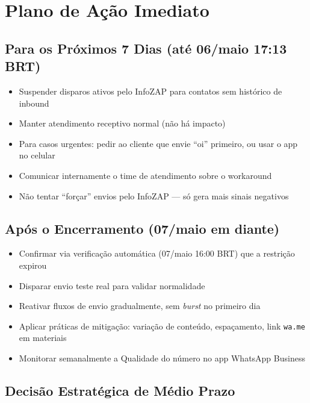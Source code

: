 \documentclass[12pt, a4paper]{article}
\begin{document}
\needspace{10cm}

\section{Plano de Ação Imediato}

\subsection{Para os Próximos 7 Dias (até 06/maio 17:13 BRT)}

\begin{itemize}[label=$\square$]
    \item Suspender disparos ativos pelo InfoZAP para contatos sem histórico de inbound
    \item Manter atendimento receptivo normal (não há impacto)
    \item Para casos urgentes: pedir ao cliente que envie ``oi'' primeiro, ou usar o app no celular
    \item Comunicar internamente o time de atendimento sobre o workaround
    \item Não tentar ``forçar'' envios pelo InfoZAP --- só gera mais sinais negativos
\end{itemize}

\subsection{Após o Encerramento (07/maio em diante)}

\begin{itemize}[label=$\square$]
    \item Confirmar via verificação automática (07/maio 16:00 BRT) que a restrição expirou
    \item Disparar envio teste real para validar normalidade
    \item Reativar fluxos de envio gradualmente, sem \textit{burst} no primeiro dia
    \item Aplicar práticas de mitigação: variação de conteúdo, espaçamento, link \texttt{wa.me} em materiais
    \item Monitorar semanalmente a Qualidade do número no app WhatsApp Business
\end{itemize}

\subsection{Decisão Estratégica de Médio Prazo}
\end{document}
